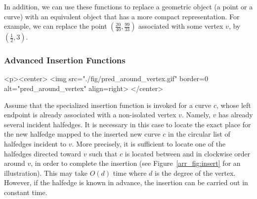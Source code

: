 In addition, we can use these functions to replace a geometric
object (a point or a curve) with an equivalent object that has a
more compact representation. For example, we can replace the point
$(\frac{20}{40}, \frac{99}{33})$ associated with some vertex $v$,
by $(\frac{1}{2}, 3)$.

\newpage
\begin{ccAdvanced}
\subsubsection{Advanced Insertion Functions}
\label{arr_sssec:adv_insert}
%
\lcTex{%
  \setlength{\widthRight}{2.5cm}
  \setlength{\widthLeft}{\widthLineReal}
  \addtolength{\widthLeft}{-\widthRight}
  \begin{minipage}{\widthLeft}
}
\begin{ccHtmlOnly}
  <p><center>
    <img src="./fig/pred_around_vertex.gif" border=0 alt="pred_around_vertex" align=right>
  </center>
\end{ccHtmlOnly}
Assume that the specialized insertion function
 is invoked for a curve $c$,
whose left endpoint is already associated with a non-isolated
vertex $v$.  Namely, $v$ has already several incident halfedges. It
is necessary in this case to locate the exact place for the
new halfedge mapped to the inserted new curve $c$ in the circular
list of halfedges incident to $v$. More precisely, it is sufficient
to locate one of the halfedges  directed toward $v$ such
that $c$ is located between  and  in
clockwise order around $v$, in order to complete the insertion
(see Figure~\ref{arr_fig:insert} for an illustration). This may
take $O(d)$ time where $d$ is the degree of the vertex. However,
if the halfedge  is known in advance, the insertion can
be carried out in constant time.


\end{ccAdvanced}

